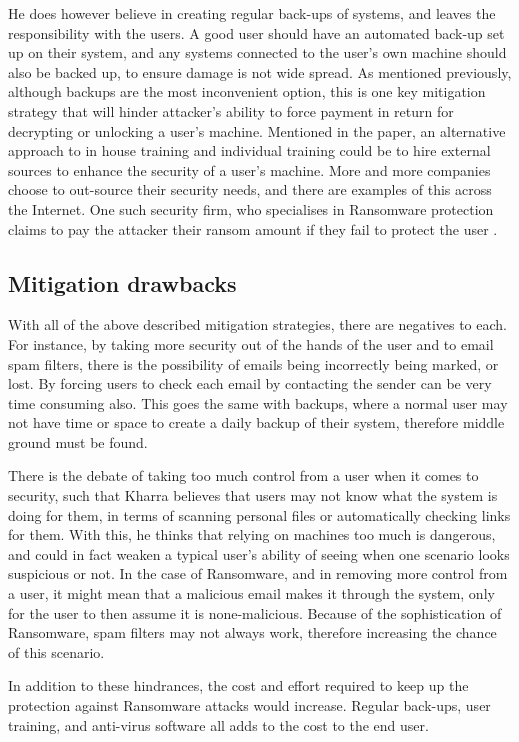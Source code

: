 \documentclass[journal,comsoc]{IEEEtran}
\begin{document}
He does however believe in creating regular back-ups of systems, and leaves the responsibility with the users. A good user should have an automated back-up set up on their system, and any systems connected to the user's own machine should also be backed up, to ensure damage is not wide spread. As mentioned previously, although backups are the most inconvenient option, this is one key mitigation strategy that will hinder attacker's ability to force payment in return for decrypting or unlocking a user's machine.
Mentioned in the paper, an alternative approach to in house training and individual training could be to hire external sources to enhance the security of a user's machine. More and more companies choose to out-source their security needs, and there are examples of this across the Internet. One such security firm, who specialises in Ransomware protection claims to pay the attacker their ransom amount if they fail to protect the user \cite{ransom}.

\subsection{Mitigation drawbacks}
With all of the above described mitigation strategies, there are negatives to each. For instance, by taking more security out of the hands of the user and to email spam filters, there is the possibility of emails being incorrectly being marked, or lost. By forcing users to check each email by contacting the sender can be very time consuming also. This goes the same with backups, where a normal user may not have time or space to create a daily backup of their system, therefore middle ground must be found. \par
There is the debate of taking too much control from a user when it comes to security, such that Kharra believes that users may not know what the system is doing for them, in terms of scanning personal files or automatically checking links for them. With this, he thinks that relying on machines too much is dangerous, and could in fact weaken a typical user’s ability of seeing when one scenario looks suspicious or not. In the case of Ransomware, and in removing more control from a user, it might mean that a malicious email makes it through the system, only for the user to then assume it is none-malicious. Because of the sophistication of Ransomware, spam filters may not always work, therefore increasing the chance of this scenario. \par
In addition to these hindrances, the cost and effort required to keep up the protection against Ransomware attacks would increase. Regular back-ups, user training, and anti-virus software all adds to the cost to the end user.
\end{document}
